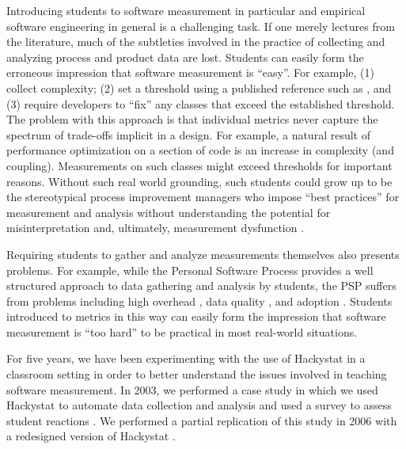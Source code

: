 \documentclass{acm_proc_article-sp}
\begin{document}
Introducing students to software measurement in particular and empirical
software engineering in general is a challenging task.  If one merely
lectures from the literature, much of the subtleties involved in the
practice of collecting and analyzing process and product data are lost.
Students can easily form the erroneous impression that software measurement
is ``easy''.  For example, (1) collect complexity; (2) set a threshold
using a published reference such as \cite{Clark08}, and (3) require
developers to ``fix'' any classes that exceed the established threshold.
The problem with this approach is that individual metrics never capture the
spectrum of trade-offs implicit in a design. For example, a natural result
of performance optimization on a section of code is an increase in
complexity (and coupling). Measurements on such classes might exceed
thresholds for important reasons.  Without such real world grounding, such
students could grow up to be the stereotypical process improvement
managers who impose ``best practices'' for measurement and analysis
without understanding the potential for misinterpretation and, ultimately,
measurement dysfunction \cite{Austen96}.

Requiring students to gather and analyze measurements themselves also
presents problems.  For example, while the Personal Software Process
\cite{Humphrey95} provides a well structured approach to data gathering and
analysis by students, the PSP suffers from problems including high overhead
\cite{csdl2-01-12}, data quality \cite{csdl-98-13}, and adoption
\cite{Borstler02}.  Students introduced to metrics in this way can easily
form the impression that software measurement is ``too hard'' to be
practical in most real-world situations.

For five years, we have been experimenting with the use of Hackystat in a
classroom setting in order to better understand the issues involved in
teaching software measurement. In 2003, we performed a case study in which 
we used Hackystat to automate data collection and analysis and used 
a survey to assess student reactions \cite{csdl2-03-12}.  We performed a 
partial replication of this study in 2006 with a redesigned version of
Hackystat \cite{csdl2-07-02}. 
\end{document}

